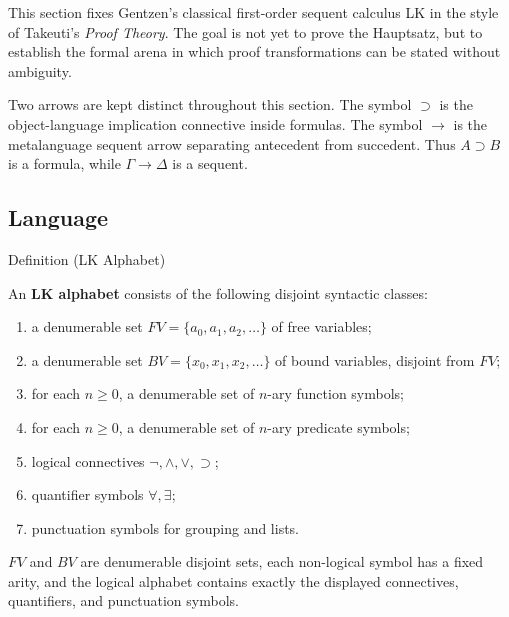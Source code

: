 
\begin{remark*}[Exposition]
This section fixes Gentzen's classical first-order sequent calculus LK in the
style of Takeuti's \emph{Proof Theory}. The goal is not yet to prove the
Hauptsatz, but to establish the formal arena in which proof transformations
can be stated without ambiguity.
\end{remark*}

\begin{remark*}[Notation]
Two arrows are kept distinct throughout this section. The symbol $\supset$ is
the object-language implication connective inside formulas. The symbol $\to$
is the metalanguage sequent arrow separating antecedent from succedent. Thus
$A \supset B$ is a formula, while $\Gamma \to \Delta$ is a sequent.
\end{remark*}

\subsection{Language}

\begin{definitionbox}{Definition (LK Alphabet)}
\begin{definition}[LK Alphabet]\label{def:lk-alphabet}
An \textbf{LK alphabet} consists of the following disjoint syntactic classes:
\begin{enumerate}
  \item a denumerable set $FV = \{a_0,a_1,a_2,\ldots\}$ of free variables;
  \item a denumerable set $BV = \{x_0,x_1,x_2,\ldots\}$ of bound variables,
        disjoint from $FV$;
  \item for each $n \geq 0$, a denumerable set of $n$-ary function symbols;
  \item for each $n \geq 0$, a denumerable set of $n$-ary predicate symbols;
  \item logical connectives $\lnot,\land,\lor,\supset$;
  \item quantifier symbols $\forall,\exists$;
  \item punctuation symbols for grouping and lists.
\end{enumerate}
\end{definition}
\end{definitionbox}

\begin{remark*}
$FV$ and $BV$ are denumerable disjoint sets, each non-logical symbol has a
fixed arity, and the logical alphabet contains exactly the displayed
connectives, quantifiers, and punctuation symbols.
\end{remark*}

